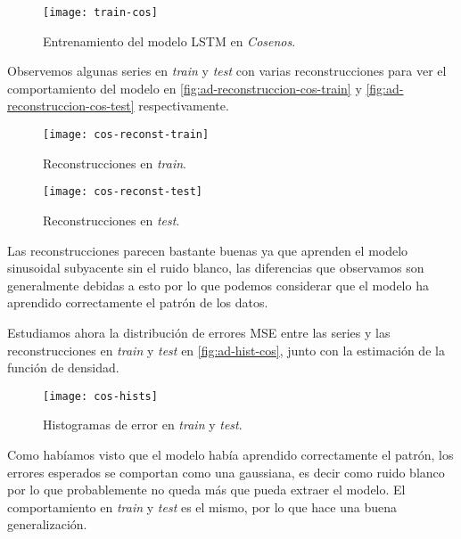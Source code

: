 \begin{figure}[htpb]
  \centering
  \texttt{[image: train-cos]}
  \caption{Entrenamiento del modelo LSTM en \emph{Cosenos}.}
  \label{fig:ad-entrenamiento-cos}
\end{figure}

Observemos algunas series en \emph{train} y \emph{test} con varias reconstrucciones para ver el comportamiento del modelo en \autoref{fig:ad-reconstruccion-cos-train} y \autoref{fig:ad-reconstruccion-cos-test} respectivamente.

\begin{figure}[htpb]
  \centering
  \texttt{[image: cos-reconst-train]}
  \caption{Reconstrucciones en \emph{train}.}
  \label{fig:ad-reconstruccion-cos-train}
\end{figure}

\begin{figure}[htpb]
  \centering
  \texttt{[image: cos-reconst-test]}
  \caption{Reconstrucciones en \emph{test}.}
  \label{fig:ad-reconstruccion-cos-test}
\end{figure}

Las reconstrucciones parecen bastante buenas ya que aprenden el modelo sinusoidal subyacente sin el ruido blanco, las diferencias que observamos son generalmente debidas a esto por lo que podemos considerar que el modelo ha aprendido correctamente el patrón de los datos.

Estudiamos ahora la distribución de errores MSE entre las series y las reconstrucciones en \emph{train} y \emph{test} en \autoref{fig:ad-hist-cos}, junto con la estimación de la función de densidad.

\begin{figure}[htpb]
  \centering
  \texttt{[image: cos-hists]}
  \caption{Histogramas de error en \emph{train} y \emph{test}.}
  \label{fig:ad-hist-cos}
\end{figure}

Como habíamos visto que el modelo había aprendido correctamente el patrón, los errores esperados se comportan como una gaussiana, es decir como ruido blanco por lo que probablemente no queda más que pueda extraer el modelo. El comportamiento en \emph{train} y \emph{test} es el mismo, por lo que hace una buena generalización.

